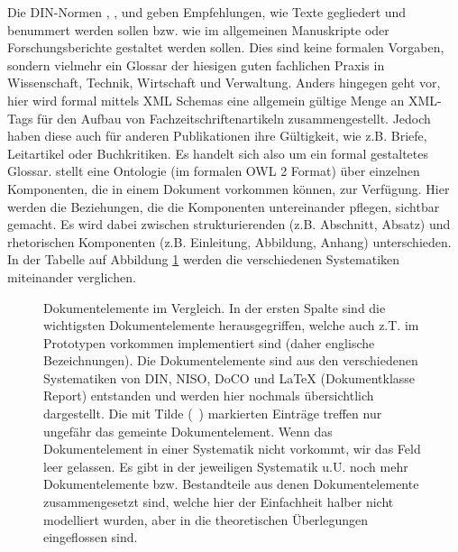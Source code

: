  
Die DIN-Normen \citep{DIN1421}, \citep{DIN1422-1}, \citep{DIN1422-3} und \citep{DIN1422-4} geben Empfehlungen, wie Texte gegliedert und benummert werden sollen bzw. wie im allgemeinen Manuskripte oder Forschungsberichte gestaltet werden sollen. Dies sind keine formalen Vorgaben, sondern vielmehr ein Glossar der hiesigen guten fachlichen Praxis in Wissenschaft, Technik, Wirtschaft und Verwaltung. Anders hingegen geht \citep{NISO} vor, hier wird formal mittels XML Schemas eine allgemein gültige Menge an XML-Tags für den Aufbau von Fachzeitschriftenartikeln zusammengestellt. Jedoch haben diese auch für anderen Publikationen ihre Gültigkeit, wie z.B. Briefe, Leitartikel oder Buchkritiken. Es handelt sich also um ein formal gestaltetes Glossar. \citep{Peroni} stellt eine Ontologie (im formalen OWL 2 Format) über einzelnen Komponenten, die in einem Dokument vorkommen können, zur Verfügung. Hier werden die Beziehungen, die die Komponenten untereinander pflegen, sichtbar gemacht. Es wird dabei zwischen strukturierenden (z.B. Abschnitt, Absatz) und rhetorischen Komponenten (z.B. Einleitung, Abbildung, Anhang) unterschieden. In der Tabelle auf Abbildung \ref{dokumentelemente-fig} werden die verschiedenen Systematiken miteinander verglichen.

 
\begin{figure}[h!]
\centering
\advance\leftskip-2.5cm
\caption[Dokumentelemente im Vergleich]{ Dokumentelemente im Vergleich. In der ersten Spalte sind die wichtigsten Dokumentelemente herausgegriffen, welche auch z.T. im Prototypen vorkommen implementiert sind (daher englische Bezeichnungen). Die Dokumentelemente sind aus den verschiedenen Systematiken von DIN, NISO, DoCO und LaTeX (Dokumentklasse Report) entstanden und werden hier nochmals übersichtlich dargestellt. Die mit Tilde (~) markierten Einträge treffen nur ungefähr das gemeinte Dokumentelement. Wenn das Dokumentelement in einer Systematik nicht vorkommt, wir das Feld leer gelassen. Es gibt in der jeweiligen Systematik u.U. noch mehr Dokumentelemente bzw. Bestandteile aus denen Dokumentelemente zusammengesetzt sind, welche hier der Einfachheit halber nicht modelliert wurden, aber in die theoretischen Überlegungen eingeflossen sind. }\label{dokumentelemente-fig}
\end{figure}
 
